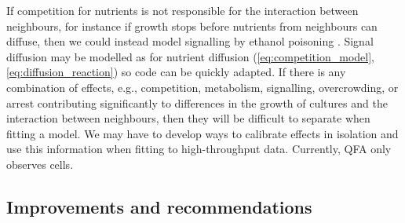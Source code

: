 If competition for nutrients is not responsible for the interaction
between neighbours, for instance if growth stops before nutrients from
neighbours can diffuse, then we could instead model signalling by
ethanol poisoning \citep{fujita2006}. Signal diffusion may be modelled
as for nutrient diffusion
(\ref{eq:competition_model},\ref{eq:diffusion_reaction}) so code can
be quickly adapted. If there is any combination of effects, e.g.,
competition, metabolism, signalling, overcrowding, or arrest
contributing significantly to differences in the growth of cultures
and the interaction between neighbours, then they will be difficult to
separate when fitting a model. We may have to develop ways to
calibrate effects in isolation and use this information when fitting
to high-throughput data. Currently, QFA only observes cells.

\subsection{Improvements and recommendations}


